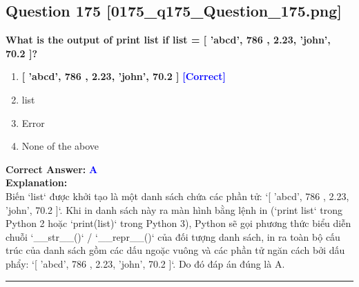 \documentclass[11pt,a4paper]{article}
\begin{document}
\begin{minipage}{\textwidth}
\subsection*{Question 175 \quad \footnotesize{[0175_q175_Question_175.png]}}
\noindent \textbf{What is the output of print list if list = [ 'abcd', 786 , 2.23, 'john', 70.2 ]?}

\begin{enumerate}[label=\Alph*.]
    \item \textbf{[ 'abcd', 786 , 2.23, 'john', 70.2 ]} \hfill \textcolor{blue}{\textbf{[Correct]}}
    \item list
    \item Error
    \item None of the above
\end{enumerate}

\noindent \textbf{Correct Answer:} \textcolor{blue}{\textbf{A}} \\[4pt]
\noindent \textbf{Explanation:}\\
Biến `list` được khởi tạo là một danh sách chứa các phần tử: `[ 'abcd', 786 , 2.23, 'john', 70.2 ]`.\newline
Khi in danh sách này ra màn hình bằng lệnh in (`print list` trong Python 2 hoặc `print(list)` trong Python 3), Python sẽ gọi phương thức biểu diễn chuỗi `__str__()` / `__repr__()` của đối tượng danh sách, in ra toàn bộ cấu trúc của danh sách gồm các dấu ngoặc vuông và các phần tử ngăn cách bởi dấu phẩy: `[ 'abcd', 786 , 2.23, 'john', 70.2 ]`. Do đó đáp án đúng là A.
\end{minipage}
\vspace{0.8cm}
\hrule
\vspace{0.5cm}
\end{document}
